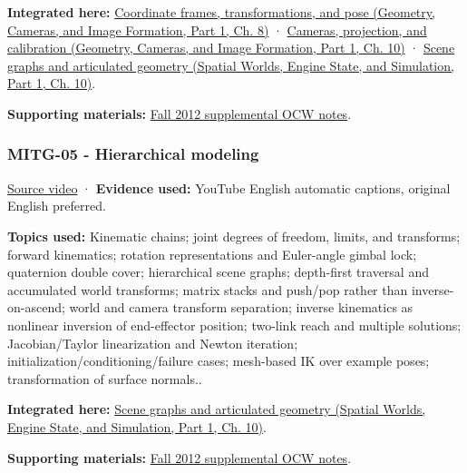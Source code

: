 \textbf{Integrated here:} \href{../03-Geometry-Cameras-and-Image-Formation-P01/main.pdf\#03-visual-computing-i-ch001-coordinate-frames-transformations-and-pose}{Coordinate frames, transformations, and pose (Geometry, Cameras, and Image Formation, Part 1, Ch. 8)} · \href{../03-Geometry-Cameras-and-Image-Formation-P01/main.pdf\#03-visual-computing-i-ch003-cameras-projection-and-calibration}{Cameras, projection, and calibration (Geometry, Cameras, and Image Formation, Part 1, Ch. 10)} · \href{../05-Spatial-Worlds-Engine-State-and-Simulation-P01/main.pdf\#04-visual-computing-ii-ch029-scene-graphs-and-articulated-geometry}{Scene graphs and articulated geometry (Spatial Worlds, Engine State, and Simulation, Part 1, Ch. 10)}.

\textbf{Supporting materials:} \href{https://ocw.mit.edu/courses/6-837-computer-graphics-fall-2012/pages/lecture-notes/}{Fall 2012 supplemental OCW notes}.

\subsubsection{MITG-05 - Hierarchical modeling}\label{04-visual-computing-ii-ch036-mitg-05---hierarchical-modeling}

\hypertarget{04-visual-computing-ii-ch036-mitg-05---hierarchical-modeling}{}

\href{https://www.youtube.com/watch?v=-Dhx44D0Iok}{Source video} · \textbf{Evidence used:} YouTube English automatic captions, original English preferred.

\textbf{Topics used:} Kinematic chains; joint degrees of freedom, limits, and transforms; forward kinematics; rotation representations and Euler-angle gimbal lock; quaternion double cover; hierarchical scene graphs; depth-first traversal and accumulated world transforms; matrix stacks and push/pop rather than inverse-on-ascend; world and camera transform separation; inverse kinematics as nonlinear inversion of end-effector position; two-link reach and multiple solutions; Jacobian/Taylor linearization and Newton iteration; initialization/conditioning/failure cases; mesh-based IK over example poses; transformation of surface normals..

\textbf{Integrated here:} \href{../05-Spatial-Worlds-Engine-State-and-Simulation-P01/main.pdf\#04-visual-computing-ii-ch029-scene-graphs-and-articulated-geometry}{Scene graphs and articulated geometry (Spatial Worlds, Engine State, and Simulation, Part 1, Ch. 10)}.

\textbf{Supporting materials:} \href{https://ocw.mit.edu/courses/6-837-computer-graphics-fall-2012/pages/lecture-notes/}{Fall 2012 supplemental OCW notes}.

